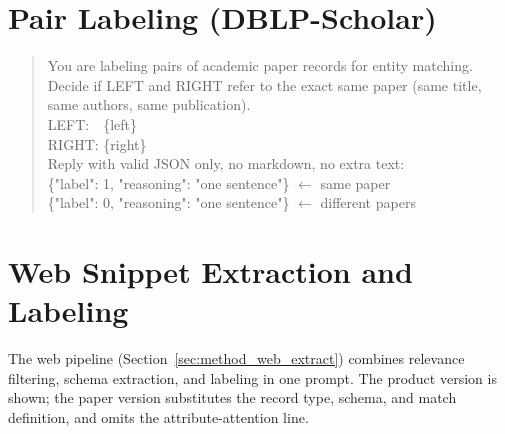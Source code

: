 \documentclass[a4paper,oneside,bibliography=totoc]{scrbook}
\begin{document}
\section{Pair Labeling (DBLP-Scholar)}
\label{app:prompt_dblp}

\begin{quote}\small\ttfamily\raggedright
You are labeling pairs of academic paper records for entity matching.\\
Decide if LEFT and RIGHT refer to the exact same paper (same title, same authors, same publication).\\[4pt]
LEFT:\ \ \{left\}\\
RIGHT: \{right\}\\[4pt]
Reply with valid JSON only, no markdown, no extra text:\\
\{"label": 1, "reasoning": "one sentence"\} $\leftarrow$ same paper\\
\{"label": 0, "reasoning": "one sentence"\} $\leftarrow$ different papers
\end{quote}

\section{Web Snippet Extraction and Labeling}
\label{app:prompt_web}

The web pipeline (Section~\ref{sec:method_web_extract}) combines relevance filtering, schema extraction, and labeling in one prompt. The product version is shown; the paper version substitutes the record type, schema, and match definition, and omits the attribute-attention line.
\end{document}
